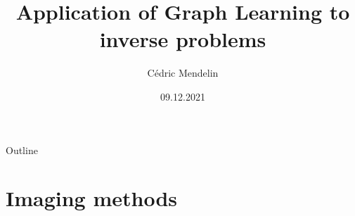\documentclass[aspectratio=169]{beamer}
\title              {Application of Graph Learning to inverse problems}
\author     		{Cédric Mendelin}
\institute          {Department of Mathematics and Computer Science, University of Basel}
\date               {09.12.2021}
\begin{document}

\begin{frame}[t,plain]
    \titlepage
\end{frame}

\begin{frame}[t]{Outline}
    \tableofcontents
\end{frame}



\section{Imaging methods}	%
\end{document}
